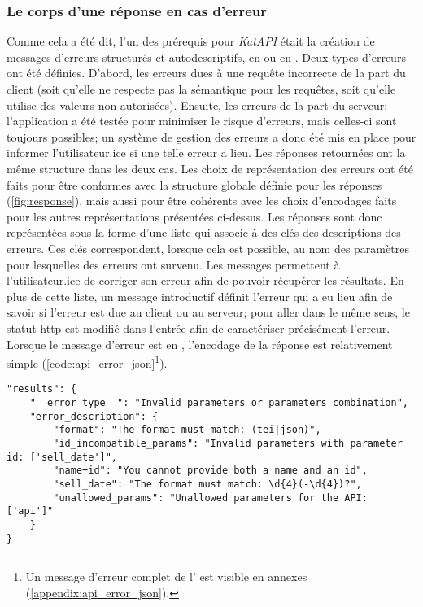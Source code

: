 \subsubsection{Le corps d'une réponse en cas d'erreur}
Comme cela a été dit, l'un des prérequis pour \textit{KatAPI} était la création de messages d'erreurs structurés et autodescriptifs, en \tei{} ou en \json{}. Deux types d'erreurs ont été définies. D'abord, les erreurs dues à une requête incorrecte de la part du client (soit qu'elle ne respecte pas la sémantique pour les requêtes, soit qu'elle utilise des valeurs non-autorisées). Ensuite, les erreurs de la part du serveur: l'application a été testée pour minimiser le risque d'erreurs, mais celles-ci sont toujours possibles; un système de gestion des erreurs a donc été mis en place pour informer l'utilisateur.ice si une telle erreur a lieu. Les réponses retournées ont la même structure dans les deux cas. Les choix de représentation des erreurs ont été faits pour être conformes avec la structure globale définie pour les réponses (\ref{fig:response}), mais aussi pour être cohérents avec les choix d'encodages faits pour les autres représentations présentées ci-dessus. Les réponses sont donc représentées sous la forme d'une liste qui associe à des clés des descriptions des erreurs. Ces clés correspondent, lorsque cela est possible, au nom des paramètres pour lesquelles des erreurs ont survenu. Les messages permettent à l'utilisateur.ice de corriger son erreur afin de pouvoir récupérer les résultats. En plus de cette liste, un message introductif définit l'erreur qui a eu lieu afin de savoir si l'erreur est due au client ou au serveur; pour aller dans le même sens, le statut \gls{http} est modifié dans l'entrée afin de caractériser précisément l'erreur. Lorsque le message d'erreur est en \json{}, l'encodage de la réponse est relativement simple (\ref{code:api_error_json}\footnote{
	Un message d'erreur complet de l'\api{} est visible en annexes (\ref{appendix:api_error_json}).
}).

\begin{listing}[h]
	\begin{verbatim}
"results": {
	"__error_type__": "Invalid parameters or parameters combination",
	"error_description": {
		"format": "The format must match: (tei|json)",
		"id_incompatible_params": "Invalid parameters with parameter id: ['sell_date']",
		"name+id": "You cannot provide both a name and an id",
		"sell_date": "The format must match: \d{4}(-\d{4})?",
		"unallowed_params": "Unallowed parameters for the API: ['api']"
	}
}
	\end{verbatim}
	\caption{Corps de réponse en cas d'erreur de la part du client en \json{}}
	\label{code:api_error_json}
\end{listing}

